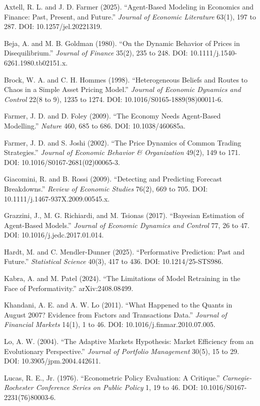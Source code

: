 \documentclass[11pt]{article}
\begin{document}
\begin{small}
\setlength{\parskip}{0.3em}

Axtell, R. L. and J. D. Farmer (2025). ``Agent-Based Modeling in Economics and Finance: Past, Present, and Future.'' \textit{Journal of Economic Literature} 63(1), 197 to 287. DOI: 10.1257/jel.20221319.

Beja, A. and M. B. Goldman (1980). ``On the Dynamic Behavior of Prices in Disequilibrium.'' \textit{Journal of Finance} 35(2), 235 to 248. DOI: 10.1111/j.1540-6261.1980.tb02151.x.

Brock, W. A. and C. H. Hommes (1998). ``Heterogeneous Beliefs and Routes to Chaos in a Simple Asset Pricing Model.'' \textit{Journal of Economic Dynamics and Control} 22(8 to 9), 1235 to 1274. DOI: 10.1016/S0165-1889(98)00011-6.

Farmer, J. D. and D. Foley (2009). ``The Economy Needs Agent-Based Modelling.'' \textit{Nature} 460, 685 to 686. DOI: 10.1038/460685a.

Farmer, J. D. and S. Joshi (2002). ``The Price Dynamics of Common Trading Strategies.'' \textit{Journal of Economic Behavior \& Organization} 49(2), 149 to 171. DOI: 10.1016/S0167-2681(02)00065-3.

Giacomini, R. and B. Rossi (2009). ``Detecting and Predicting Forecast Breakdowns.'' \textit{Review of Economic Studies} 76(2), 669 to 705. DOI: 10.1111/j.1467-937X.2009.00545.x.

Grazzini, J., M. G. Richiardi, and M. Tsionas (2017). ``Bayesian Estimation of Agent-Based Models.'' \textit{Journal of Economic Dynamics and Control} 77, 26 to 47. DOI: 10.1016/j.jedc.2017.01.014.

Hardt, M. and C. Mendler-Dunner (2025). ``Performative Prediction: Past and Future.'' \textit{Statistical Science} 40(3), 417 to 436. DOI: 10.1214/25-STS986.

Kabra, A. and M. Patel (2024). ``The Limitations of Model Retraining in the Face of Performativity.'' arXiv:2408.08499.

Khandani, A. E. and A. W. Lo (2011). ``What Happened to the Quants in August 2007? Evidence from Factors and Transactions Data.'' \textit{Journal of Financial Markets} 14(1), 1 to 46. DOI: 10.1016/j.finmar.2010.07.005.

Lo, A. W. (2004). ``The Adaptive Markets Hypothesis: Market Efficiency from an Evolutionary Perspective.'' \textit{Journal of Portfolio Management} 30(5), 15 to 29. DOI: 10.3905/jpm.2004.442611.

Lucas, R. E., Jr. (1976). ``Econometric Policy Evaluation: A Critique.'' \textit{Carnegie-Rochester Conference Series on Public Policy} 1, 19 to 46. DOI: 10.1016/S0167-2231(76)80003-6.


\end{small}
\end{document}
